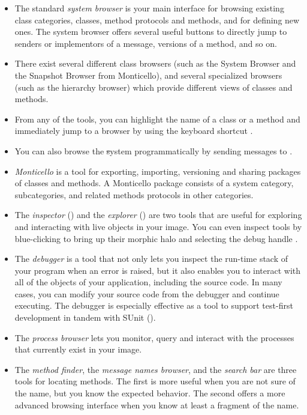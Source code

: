 \documentclass[a4paper,10pt,twoside]{book}
\begin{document}
\begin{itemize}
  \item The standard \emph{system browser} is your main interface for browsing existing class categories, classes, method protocols and methods, and for defining new ones.
  The system browser offers several useful buttons to directly jump to senders or implementors of a message, versions of a method, and so on.
  \item There exist several different class browsers (such as the System Browser and the Snapshot Browser from Monticello), and several specialized browsers (such as the hierarchy browser) which provide different views of classes and methods.
  \item From any of the tools, you can highlight the name of a class or a method and immediately jump to a browser by using the keyboard shortcut .
  \item You can also browse the \st system programmatically by sending messages to .
  \item \emph{Monticello} is a tool for exporting, importing, versioning and sharing packages of classes and methods.
  A Monticello package consists of a system category, subcategories, and related methods protocols in other categories.
  \item The \emph{inspector} () and the \emph{explorer} () are two tools that are useful for exploring and interacting with live objects in your image.
  You can even inspect tools by blue-clicking to bring up their morphic halo and selecting the debug handle \debugHandle.
  \item The \emph{debugger} is a tool that not only lets you inspect the run-time stack of your program when an error is raised, but it also enables you to interact with all of the objects of your application, including the source code.
  In many cases, you can modify your source code from the debugger and continue executing.
  The debugger is especially effective as a tool to support test-first development in tandem with SUnit ().
  \item The \emph{process browser} lets you monitor, query and interact with the processes that currently exist in your image.
  \item The \emph{method finder}, the \emph{message names browser}, and the \emph{search bar} are three tools for locating methods.
  The first is more useful when you are not sure of the name, but you know the expected behavior.
  The second offers a more advanced browsing interface when you know at least a fragment of the name.

\end{itemize}
\end{document}
